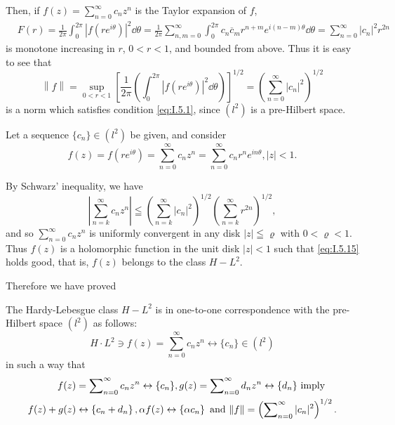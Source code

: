 Then, if $f(z) = \sum\limits_{n=0}^{\infty} c_n z^n$ is the Taylor expansion of $f$, 
\[
\begin{aligned}
&F (r)  = \frac {1}{2 \pi} \int_{0} ^{2 \pi} | f (r e ^{i \theta}) | ^{2} \dd \theta = \frac {1}{2 \pi} \sum\limits_{n,m=0} ^{\infty} \int_{0} ^{2 \pi} c_{n} \overline {{c}}_{m} r ^{n+m} e ^{i (n- m) \theta} \dd \theta = \sum\limits_{n=0} ^{\infty} | c_{n} | ^{2} r ^{2n}
\end{aligned}
\]
is monotone increasing in $r$, $0 < r < 1$, and bounded from above. Thus it is easy to see that 
\begin{equation}\label{eq:I.5.16}
\left\| f \right\| = \sup\limits_{0<r<1} \left[ \frac {1}{2 \pi} \left(\int_{0} ^{2 \pi} | f (r e ^{i \theta}) | ^{2} \dd \theta\right) \right] ^{1/2} = \left(\sum\limits_{n=0} ^{\infty} \left| c_{n} \right| ^{2}\right) ^{1/2}
\end{equation}
is a norm which satisfies condition \eqref{eq:I.5.1}, since $(l^2)$ is a pre-Hilbert space. 

\begin{remarku} Let a sequence $\{c_n\} \in (l^2)$ be given, and consider 
\[
f (z) = f \left(r e ^{i \theta}\right) = \sum\limits_{n=0} ^{\infty} c_{n} z ^{n} = \sum\limits_{n=0} ^{\infty} c_{n} r ^{n} e ^{i n \theta}, | z | < 1.
\]
\end{remarku}

By Schwarz' inequality, we have 
\[
\left| \sum\limits_{n=k} ^{\infty} c_{n} z ^{n} \right| \leqq \left(\sum\limits_{n=k} ^{\infty} \left| c_{n} \right| ^{2}\right) ^{1/2} \left(\sum\limits_{n=k} ^{\infty} r ^{2n}\right) ^{1/2},
\]
and so $\sum\limits_{n=0}^{\infty} c_n z^n$ is uniformly convergent in any disk $|z| \leqq \varrho$ with $0 < \varrho < 1$. Thus $f(z)$ is a holomorphic function in the unit disk $|z| < 1$ such that \eqref{eq:I.5.15} holds good, that is, $f(z)$ belongs to the class $H- L^2$. 

Therefore we have proved 

\begin{theorem}\label{thm:I.5.Theorem.3} The Hardy-Lebesgue class $H- L^2$ is in one-to-one correspondence with the pre-Hilbert space $(l^2)$ as follows: 
\[
H \cdot L ^{2} \ni f (z) = \sum\limits_{n=0} ^{\infty} c_{n} z ^{n} \leftrightarrow \{c_{n} \} \in (l ^{2})
\]
in such a way that 
\begin{align}
f (z)& = \sum\limits_{n=0} ^{\infty} c_{n} z ^{n} \leftrightarrow \{c_{n} \}, g (z) = \sum\limits_{n=0} ^{\infty} d_{n} z ^{n} \leftrightarrow \{d_{n} \} \text{ imply } \notag \\
f (z) + g (z)& \leftrightarrow \left\{c_{n} + d_{n} \right\}, \alpha f (z) \leftrightarrow \left\{\alpha c_{n} \right\} \text{ and } \| f \| = \left(\sum\limits_{n=0} ^{\infty} | c_{n} | ^{2}\right) ^{1/2}. \notag
\end{align}
\end{theorem}


